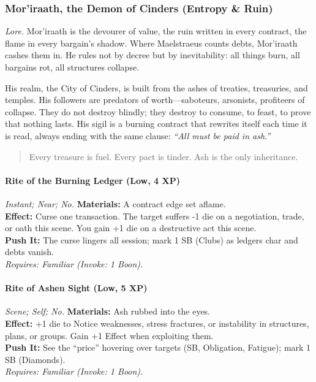 
\subsubsection{Mor’iraath, the Demon of Cinders (Entropy \& Ruin)}
\textit{Lore.} Mor’iraath is the devourer of value, the ruin written in every contract, the flame in every bargain’s shadow. Where Maelstraeus counts debts, Mor’iraath cashes them in. He rules not by decree but by inevitability: all things burn, all bargains rot, all structures collapse.  

His realm, the City of Cinders, is built from the ashes of treaties, treasuries, and temples. His followers are predators of worth—saboteurs, arsonists, profiteers of collapse. They do not destroy blindly; they destroy to consume, to feast, to prove that nothing lasts. His sigil is a burning contract that rewrites itself each time it is read, always ending with the same clause: \textit{“All must be paid in ash.”}

\begin{quote}
Every treasure is fuel. Every pact is tinder. Ash is the only inheritance.  
\end{quote}


\paragraph*{Rite of the Burning Ledger (Low, 4 XP)} \emph{Instant; Near; No.}  
\textbf{Materials:} A contract edge set aflame.\\
\textbf{Effect:} Curse one transaction. The target suffers -1 die on a negotiation, trade, or oath this scene. You gain +1 die on a destructive act this scene.\\
\textbf{Push It:} The curse lingers all session; mark 1 SB (Clubs) as ledgers char and debts vanish.\\
\emph{Requires: Familiar (\textit{Invoke:} 1 Boon).}

\paragraph*{Rite of Ashen Sight (Low, 5 XP)} \emph{Scene; Self; No.}  
\textbf{Materials:} Ash rubbed into the eyes.\\
\textbf{Effect:} +1 die to Notice weaknesses, stress fractures, or instability in structures, plans, or groups. Gain +1 Effect when exploiting them.\\
\textbf{Push It:} See the “price” hovering over targets (SB, Obligation, Fatigue); mark 1 SB (Diamonds).\\
\emph{Requires: Familiar (\textit{Invoke:} 1 Boon).}

